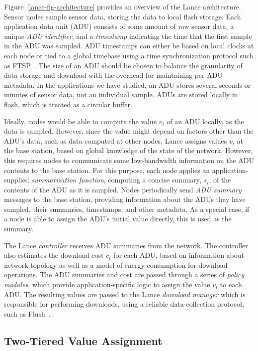 Figure~\ref{lance-fig-architecture} provides an overview of the Lance
architecture. Sensor nodes sample sensor data, storing the data to local
flash storage. Each application data unit (ADU) consists of some amount of
raw sensor data, a unique \textit{ADU identifier}, and a \textit{timestamp}
indicating the time that the first sample in the ADU was sampled. ADU
timestamps can either be based on local clocks at each node or tied to a
global timebase using a time synchronization protocol such as
FTSP~\cite{ftsp}. The size of an ADU should be chosen to balance the
granularity of data storage and download with the overhead for maintaining
per-ADU metadata. In the applications we have studied, an ADU stores several
seconds or minutes of sensor data, not an individual sample. ADUs are stored
locally in flash, which is treated as a circular buffer.

Ideally, nodes would be able to compute the value $v_i$ of an ADU locally, as
the data is sampled. However, since the value might depend on factors other
than the ADU's data, such as data computed at other nodes, Lance assigns
values $v_i$ at the base station, based on global knowledge of the state of
the network. However, this requires nodes to communicate some low-bandwidth
information on the ADU contents to the base station. For this purpose, each
node applies an application-supplied \textit{summarization function},
computing a concise summary, $s_i$, of the contents of the ADU as it is
sampled. Nodes periodically send \textit{ADU summary} messages to the base
station, providing information about the ADUs they have sampled, their
summaries, timestamps, and other metadata. As a special case, if a node is
able to assign the ADU's initial value directly, this is used as the summary.

The Lance \textit{controller} receives ADU summaries from the network. The
controller also estimates the download cost $\bar{c}_i$ for each ADU, based
on information about network topology as well as a model of energy
consumption for download operations. The ADU summaries and cost are passed
through a series of \textit{policy modules}, which provide
application-specific logic to assign the value $v_i$ to each ADU. The
resulting values are passed to the Lance \textit{download manager} which is
responsible for performing downloads, using a reliable data-collection
protocol, such as Flush~\cite{flush-sensys07}.

\subsection{Two-Tiered Value Assignment}

